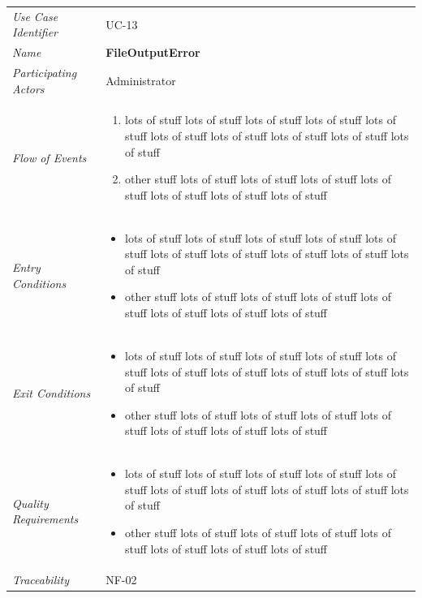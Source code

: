 \documentclass[12pt,letterpaper]{article}
\begin{document}
\begin{center}
	\begin{tabu} to 
		\toprule
		Use Case Identifier & UC-13 \\
		Name & {\bf FileOutputError} \\
		Participating Actors & Administrator \\
		Flow of Events & 
	    \begin{enumerate}[topsep=-1em]
		    \item lots of stuff lots of stuff lots of stuff lots of stuff lots of stuff lots of stuff lots of stuff lots of stuff lots of stuff lots of stuff
		    \item other stuff lots of stuff lots of stuff lots of stuff lots of stuff lots of stuff lots of stuff lots of stuff
		\end{enumerate} \\

		Entry Conditions &
		\begin{itemize}[topsep=-1em]
		    \item lots of stuff lots of stuff lots of stuff lots of stuff lots of stuff lots of stuff lots of stuff lots of stuff lots of stuff lots of stuff
		    \item other stuff lots of stuff lots of stuff lots of stuff lots of stuff lots of stuff lots of stuff lots of stuff
        \end{itemize} \\

		Exit Conditions &
		\begin{itemize}[topsep=-1em]
		    \item lots of stuff lots of stuff lots of stuff lots of stuff lots of stuff lots of stuff lots of stuff lots of stuff lots of stuff lots of stuff
		    \item other stuff lots of stuff lots of stuff lots of stuff lots of stuff lots of stuff lots of stuff lots of stuff
        \end{itemize} \\

		Quality Requirements &
		\begin{itemize}[topsep=-1em]
		    \item lots of stuff lots of stuff lots of stuff lots of stuff lots of stuff lots of stuff lots of stuff lots of stuff lots of stuff lots of stuff
		    \item other stuff lots of stuff lots of stuff lots of stuff lots of stuff lots of stuff lots of stuff lots of stuff
        \end{itemize} \\

		Traceability & NF-02 \\
		\toprule
	\end{tabu}
\end{center}
\end{document}
